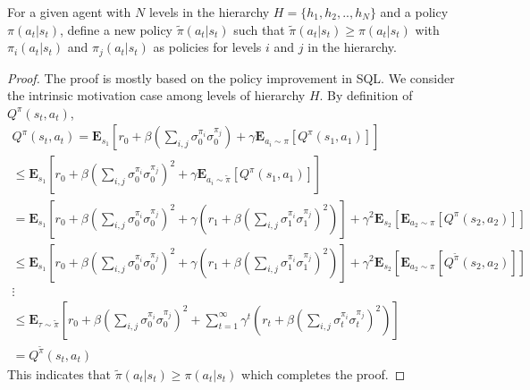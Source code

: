 \documentclass{article}
\begin{document}
\begin{prop}{3}\label{three}
    For a given agent with $N$ levels in the hierarchy $H = \{h_{1},h_{2},..,h_{N}\}$ and a policy $\pi(a_{t}|s_{t})$, define a new policy $\tilde{\pi}(a_{t}|s_{t})$ such that $\tilde{\pi}(a_{t}|s_{t}) \geq \pi(a_{t}|s_{t})$ with $\pi_{i}(a_{t}|s_{t})$ and $\pi_{j}(a_{t}|s_{t})$ as policies for levels $i$ and $j$ in the hierarchy.
\end{prop}
\begin{proof}
    The proof is mostly based on the policy improvement in SQL\cite{sql}. We consider the intrinsic motivation case among levels of hierarchy $H$. By definition of $Q^{\pi}(s_{t},a_{t})$,
    \begin{gather}
        Q^{\pi}(s_{t},a_{t}) = \textbf{E}_{s_{1}}[r_{0} + \beta(\sum_{i,j}\sigma^{\pi_{i}}_{0}\sigma^{\pi_{j}}_{0}) + \gamma \textbf{E}_{a_{i}\sim \pi}[Q^{\pi}(s_{1},a_{1})]] \nonumber \\
        \leq \textbf{E}_{s_{1}}[r_{0} + \beta(\sum_{i,j}\sigma^{\pi_{i}}_{0}\sigma^{\pi_{j}}_{0})^{2} + \gamma \textbf{E}_{a_{i}\sim \tilde{\pi}}[Q^{\pi}(s_{1},a_{1})]] \nonumber \\
        = \textbf{E}_{s_{1}}[r_{0} + \beta(\sum_{i,j}\sigma^{\pi_{i}}_{0}\sigma^{\pi_{j}}_{0})^{2} + \gamma(r_{1} + \beta(\sum_{i,j}\sigma^{\pi_{i}}_{1}\sigma^{\pi_{j}}_{1})^{2})] + \gamma^{2}\textbf{E}_{s_{2}}[\textbf{E}_{a_{2}\sim \pi}[Q^{\pi}(s_{2},a_{2})]] \nonumber \\
        \leq \textbf{E}_{s_{1}}[r_{0} + \beta(\sum_{i,j}\sigma^{\pi_{i}}_{0}\sigma^{\pi_{j}}_{0})^{2} + \gamma(r_{1} + \beta(\sum_{i,j}\sigma^{\pi_{i}}_{1}\sigma^{\pi_{j}}_{1})^{2})] + \gamma^{2}\textbf{E}_{s_{2}}[\textbf{E}_{a_{2}\sim \pi}[Q^{\tilde{\pi}}(s_{2},a_{2})]] \nonumber \\
        \vdots \nonumber \\
        \leq \textbf{E}_{\tau \sim \tilde{\pi}}[r_{0} + \beta(\sum_{i,j}\sigma^{\pi_{i}}_{0}\sigma^{\pi_{j}}_{0})^{2} + \sum_{t=1}^{\infty} \gamma^{t}(r_{t} + \beta(\sum_{i,j}\sigma^{\pi_{i}}_{t}\sigma^{\pi_{j}}_{t})^{2})] \nonumber \\
        = Q^{\tilde{\pi}}(s_{t},a_{t}) \nonumber       
    \end{gather}
    This indicates that $\tilde{\pi}(a_{t}|s_{t}) \geq \pi(a_{t}|s_{t})$ which completes the proof.
\end{proof}
\end{document}
